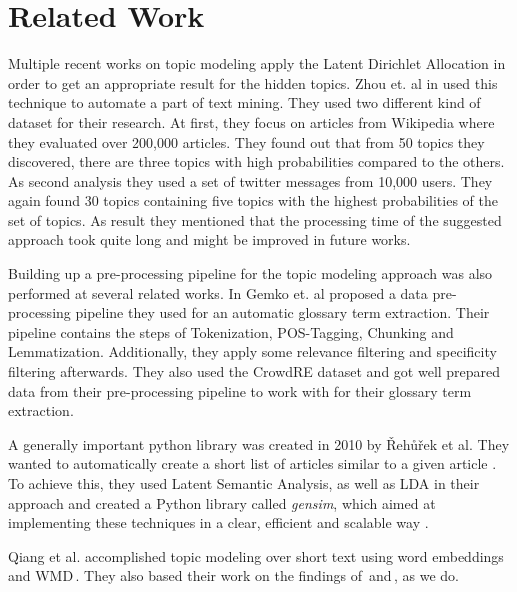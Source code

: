 \section{Related Work} %
\label{sec:related_work}

Multiple recent works on topic modeling apply the Latent Dirichlet Allocation in order to get an appropriate result for the hidden topics. Zhou et. al in \cite{zhou_tong_text_2016} used this technique to automate a part of text mining. They used two different kind of dataset for their research. At first, they focus on articles from Wikipedia where they evaluated over 200,000 articles. They found out that from 50 topics they discovered, there are three topics with high probabilities compared to the others. As second analysis they used a set of twitter messages from 10,000 users. They again found 30 topics containing five topics with the highest probabilities of the set of topics. As result they mentioned that the processing time of the suggested approach took quite long and might be improved in future works.

Building up a pre-processing pipeline for the topic modeling approach was also performed at several related works. In \cite{gemkow_automatic_2018}  Gemko et. al proposed a data pre-processing pipeline they used for an automatic glossary term extraction. Their pipeline contains the steps of Tokenization, POS-Tagging, Chunking and Lemmatization. Additionally, they apply some relevance filtering and specificity filtering afterwards. They also used the CrowdRE dataset and got well prepared data from their pre-processing pipeline to work with for their glossary term extraction.

A generally important python library was created in 2010 by {\v R}eh{\r u}{\v r}ek et al. They wanted to automatically create a short list of articles similar to a given article \cite{rehurek_software_2010}. To achieve this, they used Latent Semantic Analysis, as well as LDA in their approach and created a Python library called \emph{gensim}, which aimed at implementing these techniques in a clear, efficient and scalable way \cite{gensim_python}.

Qiang et al. accomplished topic modeling over short text using word embeddings and WMD\,\cite{qiang_topic_2016}. They also based their work on the findings of\,\cite{mikolov_efficient_2013} and\,\cite{kusner_word_2015}, as we do.